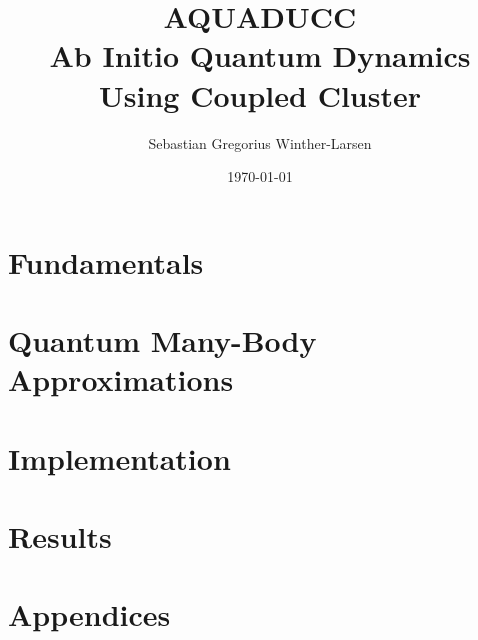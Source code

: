 \documentclass[twoside, english, notitlepage, 10pt]{uiofysmaster}
\author{Sebastian Gregorius Winther-Larsen}
\title{\textbf{AQUADUCC} \\ 
    {\Large 
    \textbf{A}b Initio \textbf{Qua}ntum 
    \textbf{D}ynamics \textbf{U}sing 
    \textbf{C}oupled \textbf{C}luster
    }
}
\date{\today}
\begin{document}
\frontmatter
    \maketitle

    \tableofcontents

\mainmatter

    \part{Fundamentals}

        
        

    \part{Quantum Many-Body Approximations}

        
        
        

    \part{Implementation}

        
         
    
    \part{Results}
        
        

    \part{Appendices}
    \appendix

        
        
        
        
        

    \printbibliography
\end{document}
